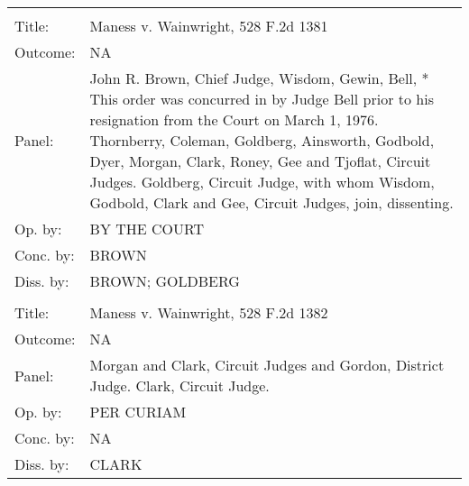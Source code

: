 \documentclass[10pt, letterpaper]{article}
\begin{document}
\begin{spacing}{1.0}
\begin{footnotesize}
\begin{longtable}[H]{lp{6in}}
        \arrayrulecolor{black}\hline\\[-4pt]
        Title: & Maness v. Wainwright, 528 F.2d 1381\\[2pt]
        Outcome: & NA\\[2pt]
        Panel: & John R. Brown, Chief Judge, Wisdom, Gewin, Bell, * This order was concurred in by Judge Bell prior to his resignation from the Court on March 1, 1976. Thornberry, Coleman, Goldberg, Ainsworth, Godbold, Dyer, Morgan, Clark, Roney, Gee and Tjoflat, Circuit Judges.  Goldberg, Circuit Judge, with whom Wisdom, Godbold, Clark and Gee, Circuit Judges, join, dissenting.\\[2pt]
        Op. by: & BY THE COURT \\[2pt]
        Conc. by: & BROWN \\[2pt]
        Diss. by: & BROWN; GOLDBERG \\[2pt]
        \arrayrulecolor{gray}\hline\\[-4pt]
        Title: & Maness v. Wainwright, 528 F.2d 1382\\[2pt]
        Outcome: & NA\\[2pt]
        Panel: & Morgan and Clark, Circuit Judges and Gordon, District Judge.  Clark, Circuit Judge.  \\[2pt]
        Op. by: & PER CURIAM \\[2pt]
        Conc. by: & NA\\[2pt]
        Diss. by: & CLARK \\[2pt]
        

\end{longtable}
\end{footnotesize}
\end{spacing}
\end{document}
